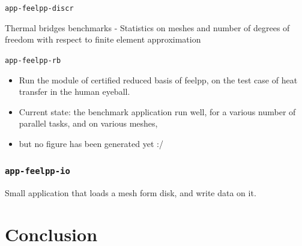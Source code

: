 \documentclass[aspectratio=169]{beamer}
\begin{document}
\begin{frame}{\texttt{app-feelpp-discr}}
{
\begin{table}[!ht]
    \centering

  \caption{Thermal bridges benchmarks - Statistics on meshes and number of degrees of freedom with respect to finite element approximation}
  \label{tab:wp1:feelpp:thermal_bridges:discr_stat}
\end{table}
}



\end{frame}

\begin{frame}{\texttt{app-feelpp-rb}}

  \begin{itemize}
    \item Run the module of certified reduced basis of feelpp, on the test case of heat transfer in the human eyeball.
    \item Current state: the benchmark application run well, for a various number of parallel tasks, and on various meshes,
    \item but no figure has been generated yet :/
  \end{itemize}

\end{frame}


\begin{frame}
  \frametitle{\texttt{app-feelpp-io}}

  Small application that loads a mesh form disk, and write data on it.

  

\end{frame}


\section{Conclusion}

\end{document}
